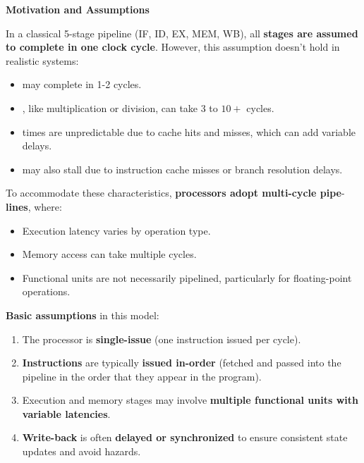 \highspace
\begin{flushleft}
    \textcolor{Green3}{ \textbf{Motivation and Assumptions}}
\end{flushleft}
In a classical 5-stage pipeline (IF, ID, EX, MEM, WB), all \textbf{stages are assumed to complete in one clock cycle}. However, this assumption doesn't hold in realistic systems:
\begin{itemize}
    \item {} may complete in 1-2 cycles.
    \item {}, like multiplication or division, can take 3 to $10+$ cycles.
    \item {} times are unpredictable due to cache hits and misses, which can add variable delays.
    \item {} may also stall due to instruction cache misses or branch resolution delays.
\end{itemize}
To accommodate these characteristics, \textbf{processors adopt multi-cycle pipe}-\break \textbf{lines}, where:
\begin{itemize}
    \item Execution latency varies by operation type.
    \item Memory access can take multiple cycles.
    \item Functional units are not necessarily pipelined, particularly for floating-point operations.
\end{itemize}
\textbf{Basic assumptions} in this model:
\begin{enumerate}
    \item The processor is \textbf{single-issue} (one instruction issued per cycle).
    \item \textbf{Instructions} are typically \textbf{issued in-order} (fetched and passed into the pipeline in the order that they appear in the program).
    \item Execution and memory stages may involve \textbf{multiple functional units with variable latencies}.
    \item \textbf{Write-back} is often \textbf{delayed or synchronized} to ensure consistent state updates and avoid hazards.
\end{enumerate}